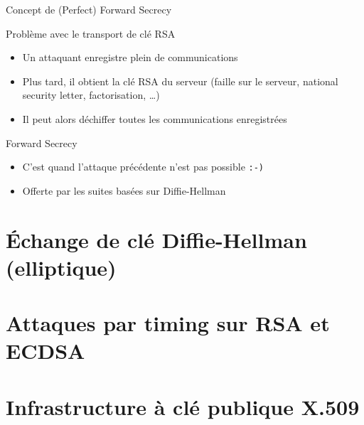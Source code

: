 \documentclass{mpg-ep-slides}
\begin{document}
\begin{frame}{Concept de (Perfect) Forward Secrecy}
  \begin{block}{Problème avec le transport de clé RSA}
    \begin{itemize}
      \item Un attaquant enregistre plein de communications
      \item Plus tard, il obtient la clé RSA du serveur (faille sur le
        serveur, national security letter, factorisation, \dots)
      \item Il peut alors déchiffer toutes les communications enregistrées
    \end{itemize}
  \end{block}

  \begin{block}{Forward Secrecy}
    \begin{itemize}
      \item C'est quand l'attaque précédente n'est pas possible
        \texttt{\string:-)}
      \item Offerte par les suites basées sur Diffie-Hellman
    \end{itemize}
  \end{block}
\end{frame}

\section[(EC)DHE]{Échange de clé Diffie-Hellman (elliptique)}
\tocsect


\section[Timing]{Attaques par timing sur RSA et ECDSA}
\tocsect


\section[PKIX]{Infrastructure à clé publique X.509}
\tocsect

\end{document}
